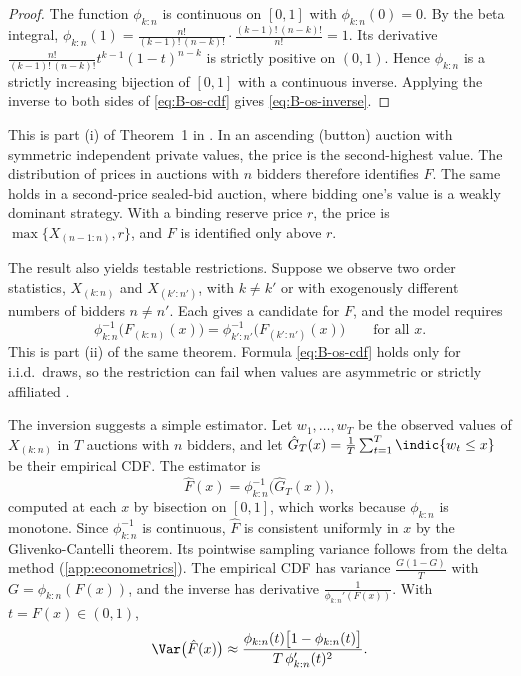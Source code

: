 \begin{proof}
The function $\phi_{k:n}$ is continuous on $[0,1]$ with $\phi_{k:n}(0) = 0$. By the beta integral,
$\phi_{k:n}(1) = \frac{n!}{(k-1)!\,(n-k)!}\cdot\frac{(k-1)!\,(n-k)!}{n!} = 1$. Its derivative
$\frac{n!}{(k-1)!\,(n-k)!}t^{k-1}(1-t)^{n-k}$ is strictly positive on $(0,1)$. Hence $\phi_{k:n}$ is a
strictly increasing bijection of $[0,1]$ with a continuous inverse. Applying the inverse to both sides of
\eqref{eq:B-os-cdf} gives \eqref{eq:B-os-inverse}.
\end{proof}

This is part (i) of Theorem~1 in \citet[p.~2115]{AtheyHaile2002}. In an ascending (button) auction with
symmetric independent private values, the price is the second-highest value. The distribution of prices in
auctions with $n$ bidders therefore identifies $F$. The same holds in a second-price sealed-bid auction,
where bidding one's value is a weakly dominant strategy. With a binding reserve price $r$, the price is
$\max\{X_{(n-1:n)}, r\}$, and $F$ is identified only above $r$.

The result also yields testable restrictions. Suppose we observe two order statistics, $X_{(k:n)}$ and
$X_{(k':n')}$, with $k \neq k'$ or with exogenously different numbers of bidders $n \neq n'$. Each gives a
candidate for $F$, and the model requires
\begin{equation*}
  \phi_{k:n}^{-1}\big(F_{(k:n)}(x)\big) = \phi_{k':n'}^{-1}\big(F_{(k':n')}(x)\big) \qquad \text{for all } x.
\end{equation*}
This is part (ii) of the same theorem. Formula \eqref{eq:B-os-cdf} holds only for i.i.d.\ draws, so the
restriction can fail when values are asymmetric or strictly affiliated \citep[fn.~20]{AtheyHaile2002}.

The inversion suggests a simple estimator. Let $w_1, \dots, w_T$ be the observed values of $X_{(k:n)}$ in $T$
auctions with $n$ bidders, and let $\hat G_T(x) = \frac{1}{T}\sum_{t=1}^{T}\indic\{w_t \leq x\}$ be their
empirical CDF. The estimator is
\begin{equation}\label{eq:B-os-estimator}
  \hat F(x) = \phi_{k:n}^{-1}\big(\hat G_T(x)\big),
\end{equation}
computed at each $x$ by bisection on $[0,1]$, which works because $\phi_{k:n}$ is monotone. Since
$\phi_{k:n}^{-1}$ is continuous, $\hat F$ is consistent uniformly in $x$ by the Glivenko-Cantelli theorem.
Its pointwise sampling variance follows from the delta method (\cref{app:econometrics}). The empirical CDF
has variance $\frac{G(1 - G)}{T}$ with $G = \phi_{k:n}(F(x))$, and the inverse has derivative
$\frac{1}{\phi_{k:n}'(F(x))}$. With $t = F(x) \in (0,1)$,
\begin{equation}\label{eq:B-os-avar}
  \Var\big(\hat F(x)\big) \approx \frac{\phi_{k:n}(t)\big[1 - \phi_{k:n}(t)\big]}{T\,\phi_{k:n}'(t)^2}.
\end{equation}

